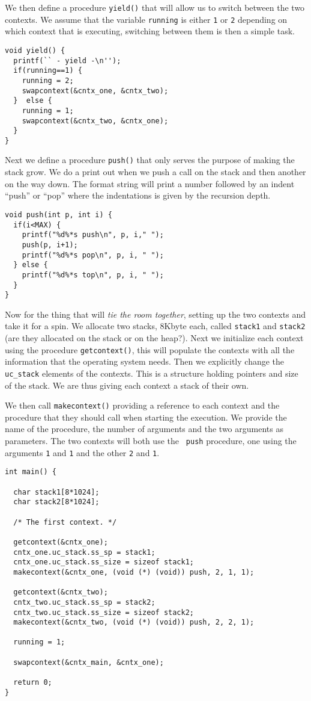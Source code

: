 \documentclass[a4paper,11pt]{article}
\begin{document}
We then define a procedure {\tt yield()} that will allow us to switch
between the two contexts. We assume that the variable {\tt running} is
either {\tt 1} or {\tt 2} depending on which context that is
executing, switching between them is then a simple task. 


\begin{lstlisting}
void yield() {
  printf(`` - yield -\n'');
  if(running==1) {
    running = 2;
    swapcontext(&cntx_one, &cntx_two);
  }  else {
    running = 1;
    swapcontext(&cntx_two, &cntx_one);
  }
}
\end{lstlisting}


Next we define a procedure {\tt push()} that only serves the purpose
of making the stack grow. We do a print out when we push a call on the
stack and then another on the way down. The format string will print a
number followed by an indent ``push'' or ``pop'' where the
indentations is given by the recursion depth.

\begin{lstlisting}
void push(int p, int i) {
  if(i<MAX) {
    printf("%d%*s push\n", p, i," "); 
    push(p, i+1);
    printf("%d%*s pop\n", p, i, " "); 
  } else {
    printf("%d%*s top\n", p, i, " ");
  }
}
\end{lstlisting}

Now for the thing that will {\em tie the room together}, setting up
the two contexts and take it for a spin. We allocate two stacks,
8Kbyte each, called {\tt stack1} and {\tt stack2} (are they allocated
on the stack or on the heap?). Next we initialize each context using
the procedure {\tt getcontext()}, this will populate the contexts with
all the information that the operating system needs. Then we
explicitly change the {\tt uc\_stack} elements of the contexts. This is
a structure holding pointers and size of the stack. We are thus giving
each context a stack of their own.

We then call {\tt makecontext()} providing a reference to each context
and the procedure that they should call when starting the execution. We
provide the name of the procedure, the number of arguments and the two
arguments as parameters. The two contexts will both use the {\tt
  push} procedure, one using the arguments {\tt 1} and {\tt 1} and the
other {\tt 2} and {\tt 1}.


\begin{lstlisting}
int main() {

  char stack1[8*1024];
  char stack2[8*1024];

  /* The first context. */
  
  getcontext(&cntx_one);
  cntx_one.uc_stack.ss_sp = stack1;
  cntx_one.uc_stack.ss_size = sizeof stack1;
  makecontext(&cntx_one, (void (*) (void)) push, 2, 1, 1);

  getcontext(&cntx_two);
  cntx_two.uc_stack.ss_sp = stack2;
  cntx_two.uc_stack.ss_size = sizeof stack2;
  makecontext(&cntx_two, (void (*) (void)) push, 2, 2, 1);

  running = 1;
  
  swapcontext(&cntx_main, &cntx_one);

  return 0;
}
\end{lstlisting}
\end{document}
